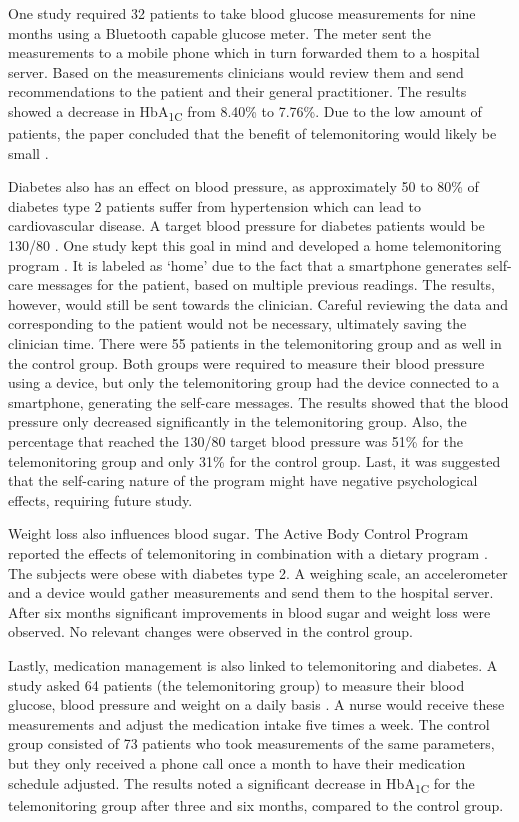         One study required 32 patients to take blood glucose measurements for nine months using a Bluetooth capable glucose meter. The meter sent the measurements to a mobile phone which in turn forwarded them to a hospital server. Based on the measurements clinicians would review them and send recommendations to the patient and their general practitioner. The results showed a decrease in HbA\textsubscript{1C} from 8.40\% to 7.76\%. Due to the low amount of patients, the paper concluded that the benefit of telemonitoring would likely be small \cite{istepanian2009evaluation}.

        Diabetes also has an effect on blood pressure, as approximately 50 to 80\% of diabetes type 2 patients suffer from hypertension which can lead to cardiovascular disease. A target blood pressure for diabetes patients would be 130/80 \cite{landsberg2004diabetes}. One study kept this goal in mind and developed a home telemonitoring program \cite{logan2012effect}. It is labeled as `home' due to the fact that a smartphone generates self-care messages for the patient, based on multiple previous readings. The results, however, would still be sent towards the clinician. Careful reviewing the data and corresponding to the patient would not be necessary, ultimately saving the clinician time. There were 55 patients in the telemonitoring group and as well in the control group. Both groups were required to measure their blood pressure using a device, but only the telemonitoring group had the device connected to a smartphone, generating the self-care messages. The results showed that the blood pressure only decreased significantly in the telemonitoring group. Also, the percentage that reached the 130/80 target blood pressure was 51\% for the telemonitoring group and only 31\% for the control group. Last, it was suggested that the self-caring nature of the program might have negative psychological effects, requiring future study.

        Weight loss also influences blood sugar. The Active Body Control Program reported the effects of telemonitoring in combination with a dietary program \cite{luley2011weight}. The subjects were obese with diabetes type 2. A weighing scale, an accelerometer and a device would gather measurements and send them to the hospital server. After six months significant improvements in blood sugar and weight loss were observed. No relevant changes were observed in the control group.

        Lastly, medication management is also linked to telemonitoring and diabetes. A study asked 64 patients (the telemonitoring group) to measure their blood glucose, blood pressure and weight on a daily basis \cite{stone2009active}. A nurse would receive these measurements and adjust the medication intake five times a week. The control group consisted of 73 patients who took measurements of the same parameters, but they only received a phone call once a month to have their medication schedule adjusted. The results noted a significant decrease in HbA\textsubscript{1C} for the telemonitoring group after three and six months, compared to the control group.

